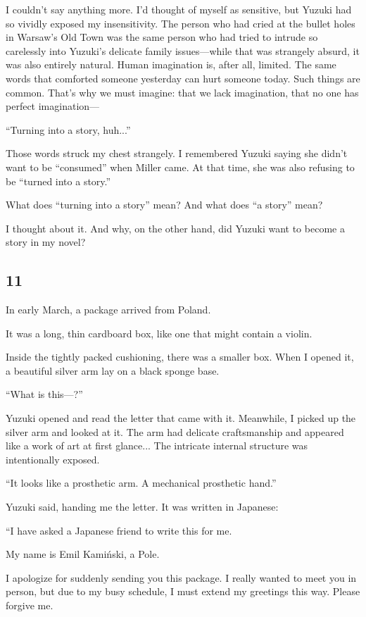 \documentclass[
    a4paper,
    12pt,
    twoside,
    openany,
    UTF8,
    fontset=windows
]{ctexbook}
\begin{document}
I couldn't say anything more. I'd thought of myself as sensitive, but Yuzuki had so vividly exposed my insensitivity. The person who had cried at the bullet holes in Warsaw's Old Town was the same person who had tried to intrude so carelessly into Yuzuki's delicate family issues---while that was strangely absurd, it was also entirely natural. Human imagination is, after all, limited. The same words that comforted someone yesterday can hurt someone today. Such things are common. That's why we must imagine: that we lack imagination, that no one has perfect imagination---

``Turning into a story, huh...''

Those words struck my chest strangely. I remembered Yuzuki saying she didn't want to be ``consumed'' when Miller came. At that time, she was also refusing to be ``turned into a story.''

What does ``turning into a story'' mean? And what does ``a story'' mean?

I thought about it. And why, on the other hand, did Yuzuki want to become a story in my novel?


\subsection*{11}

In early March, a package arrived from Poland.

It was a long, thin cardboard box, like one that might contain a violin.

Inside the tightly packed cushioning, there was a smaller box. When I opened it, a beautiful silver arm lay on a black sponge base.

``What is this---?''

Yuzuki opened and read the letter that came with it. Meanwhile, I picked up the silver arm and looked at it. The arm had delicate craftsmanship and appeared like a work of art at first glance... The intricate internal structure was intentionally exposed.

``It looks like a prosthetic arm. A mechanical prosthetic hand.''

Yuzuki said, handing me the letter. It was written in Japanese:

``I have asked a Japanese friend to write this for me.

My name is Emil Kamiński, a Pole.

I apologize for suddenly sending you this package. I really wanted to meet you in person, but due to my busy schedule, I must extend my greetings this way. Please forgive me.
\end{document}

